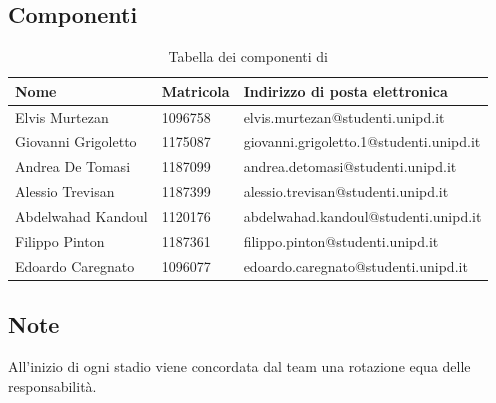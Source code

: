 \subsection{Componenti}
{
    \renewcommand{\arraystretch}{2}
	\begin{longtable}{ C{4cm} C{2cm} C{8cm} }
		\caption{Tabella dei componenti di \Gruppo{}}\\
		\rowcolor{\primaryColor}
        \textcolor{\secondaryColor}{\textbf{Nome}} & \textcolor{\secondaryColor}{\textbf{Matricola}} & \textcolor{\secondaryColor}{\textbf{Indirizzo di posta elettronica}}\\\endhead	
        {Elvis Murtezan} & 1096758 & {elvis.murtezan@studenti.unipd.it}\\   
        {Giovanni Grigoletto} & 1175087 & {giovanni.grigoletto.1@studenti.unipd.it}\\    
        {Andrea De Tomasi} & 1187099 & {andrea.detomasi@studenti.unipd.it}\\    
        {Alessio Trevisan} & 1187399 & {alessio.trevisan@studenti.unipd.it}\\    
        {Abdelwahad Kandoul} & 1120176 & {abdelwahad.kandoul@studenti.unipd.it} \\    
        {Filippo Pinton} & 1187361 & {filippo.pinton@studenti.unipd.it}\\    
        {Edoardo Caregnato} & 1096077 & {edoardo.caregnato@studenti.unipd.it}\\       
	\end{longtable}
}
\subsection{Note}
All'inizio di ogni stadio viene concordata dal team una rotazione equa delle responsabilità.